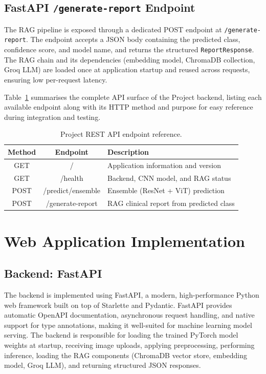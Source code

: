 \documentclass[12pt]{report}
\begin{document}
\subsection{FastAPI \texttt{/generate-report} Endpoint}

The RAG pipeline is exposed through a dedicated POST endpoint at \texttt{/generate-report}. The endpoint accepts a JSON body containing the predicted class, confidence score, and model name, and returns the structured \texttt{ReportResponse}. The RAG chain and its dependencies (embedding model, ChromaDB collection, Groq LLM) are loaded once at application startup and reused across requests, ensuring low per-request latency.

Table~\ref{tab:api} summarises the complete API surface of the Project backend, listing each available endpoint along with its HTTP method and purpose for easy reference during integration and testing.

\begin{table}[H]
\centering
\caption{Project REST API endpoint reference.}
\label{tab:api}
\begin{tabularx}{\textwidth}{|c|c|X|}
\hline
Method & Endpoint & Description \\
\hline
GET  & /                 & Application information and version \\
\hline
GET  & /health           & Backend, CNN model, and RAG status \\
\hline
POST & /predict/ensemble & Ensemble (ResNet + ViT) prediction \\
\hline
POST & /generate-report  & RAG clinical report from predicted class \\
\hline
\end{tabularx}
\end{table}
\FloatBarrier

\section{Web Application Implementation}

\subsection{Backend: FastAPI}

The backend is implemented using FastAPI, a modern, high-performance Python web framework built on top of Starlette and Pydantic. FastAPI provides automatic OpenAPI documentation, asynchronous request handling, and native support for type annotations, making it well-suited for machine learning model serving. The backend is responsible for loading the trained PyTorch model weights at startup, receiving image uploads, applying preprocessing, performing inference, loading the RAG components (ChromaDB vector store, embedding model, Groq LLM), and returning structured JSON responses.
\end{document}
